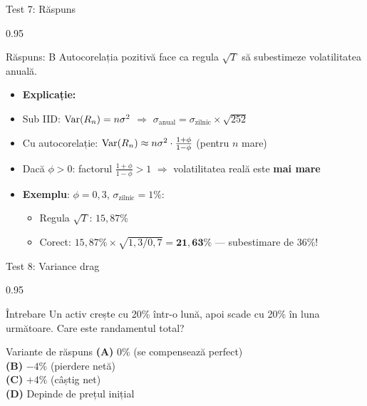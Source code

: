 \documentclass[9pt, aspectratio=169, t]{beamer}
\begin{document}
\begin{frame}[shrink=10]{Test 7: Răspuns}
\begin{cminipage}{0.95\textwidth}
    \begin{exampleblock}{Răspuns: B}
        Autocorelația pozitivă face ca regula $\sqrt{T}$ să subestimeze volatilitatea anuală.
    \end{exampleblock}
    \vspace{0.2cm}
    \begin{itemize}\setlength{\itemsep}{0pt}
        \item \textbf{Explicație:}
        \item Sub IID: $\text{Var}(R_n) = n\sigma^2$ $\Rightarrow$ $\sigma_{\text{anual}} = \sigma_{\text{zilnic}} \times \sqrt{252}$
        \item Cu autocorelație: $\text{Var}(R_n) \approx n\sigma^2 \cdot \frac{1+\phi}{1-\phi}$ (pentru $n$ mare)
        \item Dacă $\phi > 0$: factorul $\frac{1+\phi}{1-\phi} > 1$ $\Rightarrow$ volatilitatea reală este \textbf{mai mare}
        \item \textbf{Exemplu}: $\phi = 0{,}3$, $\sigma_{\text{zilnic}} = 1\%$:
        \begin{itemize}\setlength{\itemsep}{0pt}
            \item Regula $\sqrt{T}$: $15{,}87\%$
            \item Corect: $15{,}87\% \times \sqrt{1{,}3/0{,}7} = \mathbf{21{,}63\%}$ --- subestimare de 36\%!
        \end{itemize}
    \end{itemize}
\end{cminipage}
\end{frame}

\begin{frame}[shrink=10]{Test 8: Variance drag}
\begin{cminipage}{0.95\textwidth}
    \begin{alertblock}{Întrebare}
        Un activ crește cu 20\% într-o lună, apoi scade cu 20\% în luna următoare. Care este randamentul total?
    \end{alertblock}

    \vspace{0.5cm}
    \begin{block}{Variante de răspuns}
    \textcolor{MainBlue}{\textbf{(A)}} 0\% (se compensează perfect)\\[3pt]
    \textcolor{MainBlue}{\textbf{(B)}} $-4\%$ (pierdere netă)\\[3pt]
    \textcolor{MainBlue}{\textbf{(C)}} $+4\%$ (câștig net)\\[3pt]
    \textcolor{MainBlue}{\textbf{(D)}} Depinde de prețul inițial
    \end{block}
\end{cminipage}
\end{frame}
\end{document}
